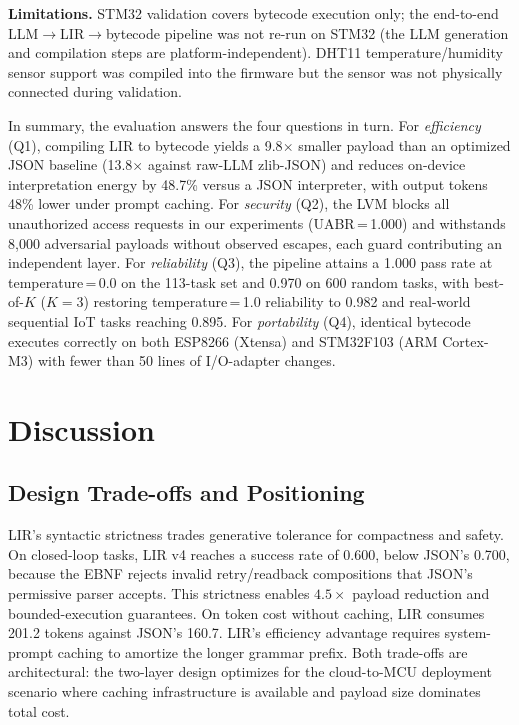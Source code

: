 \documentclass[a4paper,fleqn,longmktitle]{cas-dc}
\begin{document}
\textbf{Limitations.} STM32 validation covers bytecode execution only; the end-to-end LLM$\to$LIR$\to$bytecode pipeline was not re-run on STM32 (the LLM generation and compilation steps are platform-independent). DHT11 temperature/humidity sensor support was compiled into the firmware but the sensor was not physically connected during validation.

In summary, the evaluation answers the four questions in turn. For \emph{efficiency} (Q1), compiling LIR to bytecode yields a 9.8$\times$ smaller payload than an optimized JSON baseline (13.8$\times$ against raw-LLM zlib-JSON) and reduces on-device interpretation energy by 48.7\% versus a JSON interpreter, with output tokens 48\% lower under prompt caching. For \emph{security} (Q2), the LVM blocks all unauthorized access requests in our experiments (UABR\,=\,1.000) and withstands 8{,}000 adversarial payloads without observed escapes, each guard contributing an independent layer. For \emph{reliability} (Q3), the pipeline attains a 1.000 pass rate at temperature\,=\,0.0 on the 113-task set and 0.970 on 600 random tasks, with best-of-$K$ ($K{=}3$) restoring temperature\,=\,1.0 reliability to 0.982 and real-world sequential IoT tasks reaching 0.895. For \emph{portability} (Q4), identical bytecode executes correctly on both ESP8266 (Xtensa) and STM32F103 (ARM Cortex-M3) with fewer than 50 lines of I/O-adapter changes.

\section{Discussion}
\label{sec:discussion}

\subsection{Design Trade-offs and Positioning}
\label{sec:limitations_detail}

LIR's syntactic strictness trades generative tolerance for compactness and safety. On closed-loop tasks, LIR v4 reaches a success rate of 0.600, below JSON's 0.700, because the EBNF rejects invalid retry/readback compositions that JSON's permissive parser accepts. This strictness enables $4.5\times$ payload reduction and bounded-execution guarantees. On token cost without caching, LIR consumes 201.2 tokens against JSON's 160.7. LIR's efficiency advantage requires system-prompt caching to amortize the longer grammar prefix. Both trade-offs are architectural: the two-layer design optimizes for the cloud-to-MCU deployment scenario where caching infrastructure is available and payload size dominates total cost.
\end{document}
